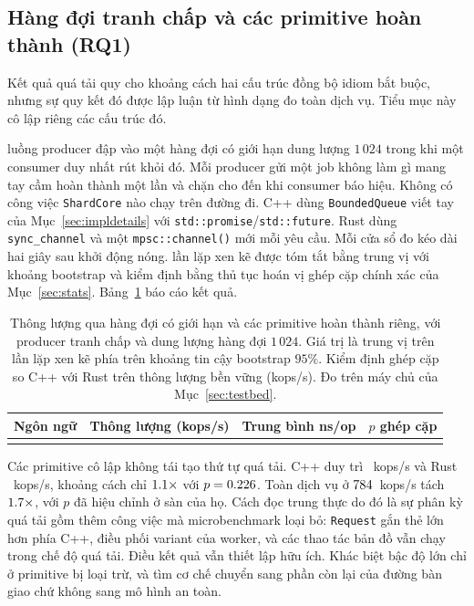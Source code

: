 \subsection{Hàng đợi tranh chấp và các primitive hoàn thành (RQ1)}\label{sec:contention}
Kết quả quá tải quy cho khoảng cách hai cấu trúc đồng bộ idiom bắt buộc, nhưng
sự quy kết đó được lập luận từ hình dạng đo toàn dịch vụ. Tiểu mục này
cô lập riêng các cấu trúc đó.

\ContentionProducers{} luồng producer đập vào một hàng đợi có giới hạn dung lượng $1\,024$ trong khi một
consumer duy nhất rút khỏi đó. Mỗi producer gửi một job không làm gì mang tay cầm hoàn thành một lần và chặn
cho đến khi consumer báo hiệu. Không có công việc \texttt{ShardCore} nào chạy trên đường đi. C++ dùng
\texttt{BoundedQueue} viết tay của Mục~\ref{sec:impldetails} với
\texttt{std::promise}/\texttt{std::future}. Rust dùng \texttt{sync\_channel} và một
\texttt{mpsc::channel()} mới mỗi yêu cầu. Mỗi cửa sổ đo kéo dài hai giây sau khởi động nóng.
\ContentionRepeats{} lần lặp xen kẽ được tóm tắt bằng trung vị với khoảng bootstrap và
kiểm định bằng thủ tục hoán vị ghép cặp chính xác của Mục~\ref{sec:stats}.
Bảng~\ref{tab:contention} báo cáo kết quả.

\begin{table}[H]
\centering
\small
\caption[Thông lượng qua các primitive đồng bộ tranh chấp riêng]{Thông lượng qua
hàng đợi có giới hạn và các primitive hoàn thành riêng, với \ContentionProducers{} producer tranh chấp
và dung lượng hàng đợi $1\,024$. Giá trị là trung vị trên \ContentionRepeats{} lần lặp xen kẽ phía trên
khoảng tin cậy bootstrap $95\%$. Kiểm định ghép cặp so C++ với Rust trên thông lượng
bền vững (kops/s). Đo trên máy chủ của Mục~\ref{sec:testbed}.\label{tab:contention}}
\begin{tabular}{@{}l r r r@{}}
\hline\hline
Ngôn ngữ & Thông lượng (kops/s) & Trung bình ns/op & $p$ ghép cặp \\
\hline
\\
\hline
\end{tabular}
\end{table}

Các primitive cô lập không tái tạo thứ tự quá tải. C++ duy trì
\ContentionThrCpp{}~kops/s và Rust \ContentionThrRust{}~kops/s, khoảng cách chỉ
$1.1\times$ với $p = 0.226$. Toàn dịch vụ ở
$784$~kops/s tách $1.7\times$, với $p$ đã hiệu chỉnh ở
sàn của họ. Cách đọc trung thực do đó là sự phân kỳ quá tải gồm thêm
công việc mà microbenchmark loại bỏ: \texttt{Request} gắn thẻ lớn hơn phía C++, 
điều phối variant của worker, và các thao tác bản đồ vẫn chạy trong chế độ quá tải.
Điều kết quả vẫn thiết lập hữu ích. Khác biệt bậc độ lớn chỉ ở primitive
bị loại trừ, và tìm cơ chế chuyển sang phần còn lại của đường bàn giao chứ không
sang mô hình an toàn.

